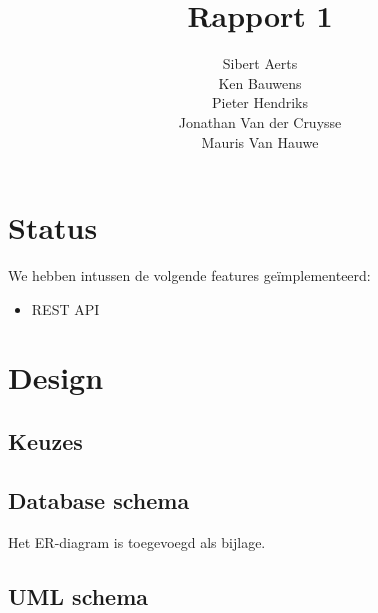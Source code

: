 \documentclass[12pt,a4paper]{article}
\begin{document}
\title{Rapport 1}
\author{Sibert Aerts \\ Ken Bauwens \\ Pieter Hendriks \\ Jonathan Van der Cruysse \\ Mauris Van Hauwe}
\maketitle

\newcommand{\code}[1]{\texttt{#1}}

\section{Status}

We hebben intussen de volgende features ge\"implementeerd:

\begin{itemize}

\item REST API

\end{itemize}

\section{Design}

\subsection{Keuzes}

\subsection{Database schema}
Het ER-diagram is toegevoegd als bijlage.

\subsection{UML schema}
\end{document}

